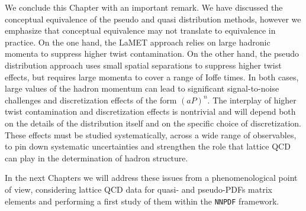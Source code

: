 We conclude this Chapter with an important remark.
We have discussed the conceptual equivalence of the pseudo and quasi distribution methods,
however we emphasize that conceptual equivalence may not translate to
equivalence in practice. On the one hand, the LaMET approach relies on large
hadronic momenta to suppress higher twist contamination. On the other hand, the
pseudo distribution approach uses small spatial separations to suppress higher
twist effects, but requires large momenta to cover a range of Ioffe times. In
both cases, large values of the hadron momentum can lead to significant
signal-to-noise challenges and discretization effects of the form $(aP)^n$. The
interplay of higher twist contamination and discretization effects is nontrivial
and will depend both on the details of the distribution itself and on the
specific choice of discretization. These effects must be studied systematically,
across a wide range of observables, to pin down systematic uncertainties and
strengthen the role that lattice QCD can play in the determination of hadron
structure.

In the next Chapters we will address these issues from a phenomenological point of view,
considering lattice QCD data for quasi- and pseudo-PDFs matrix elements and 
performing a first study of them within the {\tt NNPDF} framework.
